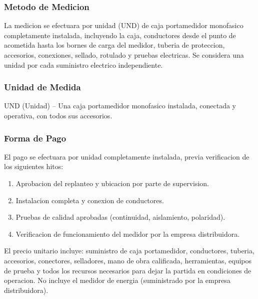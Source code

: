 \subsubsection{Metodo de Medicion}

La medicion se efectuara por unidad (UND) de caja portamedidor monofasico completamente instalada, incluyendo la caja, conductores desde el punto de acometida hasta los bornes de carga del medidor, tuberia de proteccion, accesorios, conexiones, sellado, rotulado y pruebas electricas. Se considera una unidad por cada suministro electrico independiente.

\subsubsection{Unidad de Medida}

UND (Unidad) -- Una caja portamedidor monofasico instalada, conectada y operativa, con todos sus accesorios.

\subsubsection{Forma de Pago}

El pago se efectuara por unidad completamente instalada, previa verificacion de los siguientes hitos:
\begin{enumerate}
  \item Aprobacion del replanteo y ubicacion por parte de supervision.
  \item Instalacion completa y conexion de conductores.
  \item Pruebas de calidad aprobadas (continuidad, aislamiento, polaridad).
  \item Verificacion de funcionamiento del medidor por la empresa distribuidora.
\end{enumerate}

El precio unitario incluye: suministro de caja portamedidor, conductores, tuberia, accesorios, conectores, selladores, mano de obra calificada, herramientas, equipos de prueba y todos los recursos necesarios para dejar la partida en condiciones de operacion. No incluye el medidor de energia (suministrado por la empresa distribuidora).
